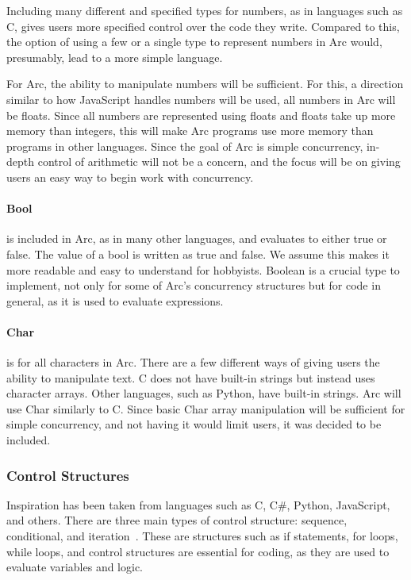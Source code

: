 Including many different and specified types for numbers, as in languages such as C, gives users more specified control over the code they write. Compared to this, the option of using a few or a single type to represent numbers in Arc would, presumably, lead to a more simple language.

For Arc, the ability to manipulate numbers will be sufficient. For this, a direction similar to how JavaScript handles numbers will be used, all numbers in Arc will be floats. Since all numbers are represented using floats and floats take up more memory than integers, this will make Arc programs use more memory than programs in other languages. Since the goal of Arc is simple concurrency, in-depth control of arithmetic will not be a concern, and the focus will be on giving users an easy way to begin work with concurrency.

\paragraph{Bool} is included in Arc, as in many other languages, and evaluates to either true or false. The value of a bool is written as true and false. We assume this makes it more readable and easy to understand for hobbyists. Boolean is a crucial type to implement, not only for some of Arc's concurrency structures but for code in general, as it is used to evaluate expressions.

\paragraph{Char} is for all characters in Arc. There are a few different ways of giving users the ability to manipulate text. C does not have built-in strings but instead uses character arrays. Other languages, such as Python, have built-in strings. Arc will use Char similarly to C. Since basic Char array manipulation will be sufficient for simple concurrency, and not having it would limit users, it was decided to be included.


\subsubsection{Control Structures}
Inspiration has been taken from languages such as C, C\#, Python, JavaScript, and others. There are three main types of control structure: sequence, conditional, and iteration~\cite{CBook}. These are structures such as if statements, for loops, while loops, and control structures are essential for coding, as they are used to evaluate variables and logic.



